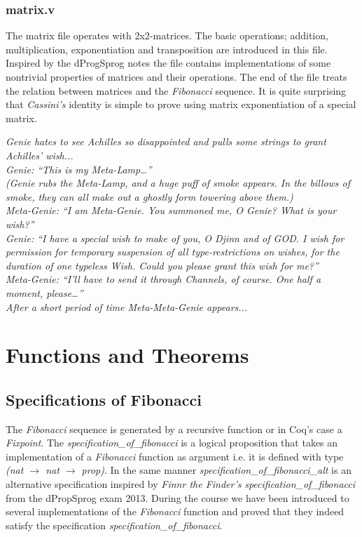 \documentclass[9pt,a4paper,oneside]{article}
\begin{document}
\subsubsection{matrix.v}
The matrix file operates with 2x2-matrices. The basic operations; addition, multiplication, exponentiation and transposition are introduced in this file. Inspired by the dProgSprog notes the file contains implementations of some nontrivial properties of matrices and their operations. The end of the file treats the relation between matrices and the \textit{Fibonacci} sequence. It is quite surprising that \textit{Cassini’s} identity is simple to prove using matrix exponentiation of a special matrix.\newpage


\noindent\textit{Genie hates to see Achilles so disappointed and pulls some strings to grant Achilles' wish...\\
Genie: “This is my Meta-Lamp…”\\
(Genie rubs the Meta-Lamp, and a huge puff of smoke appears. In the billows of smoke, they can all make out a ghostly form towering above them.)\\
Meta-Genie: “I am Meta-Genie. You summoned me, O Genie? What is your wish?”\\
Genie: “I have a special wish to make of you, O Djinn and of GOD. I wish for permission for temporary suspension of all type-restrictions on wishes, for the duration of one typeless Wish. Could you please grant this wish for me?”\\
Meta-Genie: ``I’ll have to send it through Channels, of course. One half a moment, please…''\\
After a short period of time Meta-Meta-Genie appears...}


\section{Functions and Theorems}
\subsection{Specifications of Fibonacci}
The \textit{Fibonacci} sequence is generated by a recursive function or in Coq's case a \textit{Fixpoint}. The \textit{specification\_of\_fibonacci} is a logical proposition that takes an implementation of a \textit{Fibonacci} function as argument i.e. it is defined with type \textit{(nat $\rightarrow$ nat $\rightarrow$ prop)}. In the same manner \textit{specification\_of\_fibonacci\_alt} is an alternative specification inspired by \textit{Finnr the Finder's} \textit{specification\_of\_fibonacci} from the dPropSprog exam 2013. During the course we have been introduced to several implementations of the \textit{Fibonacci} function and proved that they indeed satisfy the specification \textit{specification\_of\_fibonacci}. 
\end{document}
